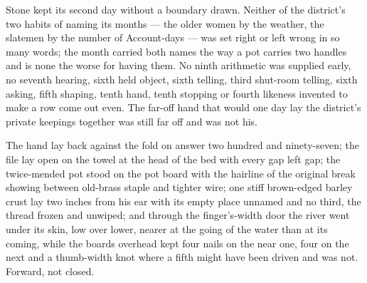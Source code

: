 Stone kept its second day without a boundary drawn. Neither of the district's two habits of naming its months --- the older women by the weather, the slatemen by the number of Account-days --- was set right or left wrong in so many words; the month carried both names the way a pot carries two handles and is none the worse for having them. No ninth arithmetic was supplied early, no seventh hearing, sixth held object, sixth telling, third shut-room telling, sixth asking, fifth shaping, tenth hand, tenth stopping or fourth likeness invented to make a row come out even. The far-off hand that would one day lay the district's private keepings together was still far off and was not his.

The hand lay back against the fold on answer two hundred and ninety-seven; the file lay open on the towel at the head of the bed with every gap left gap; the twice-mended pot stood on the pot board with the hairline of the original break showing between old-brass staple and tighter wire; one stiff brown-edged barley crust lay two inches from his ear with its empty place unnamed and no third, the thread frozen and unwiped; and through the finger's-width door the river went under its skin, low over lower, nearer at the going of the water than at its coming, while the boards overhead kept four nails on the near one, four on the next and a thumb-width knot where a fifth might have been driven and was not. Forward, not closed.
